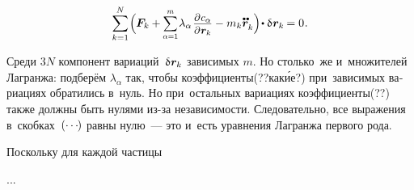\begin{otherlanguage}{russian}
\nopagebreak\vspace{-0.2em}\begin{equation}
\displaystyle \sum_{k=1}^{N} \hspace{-0.2ex} \left(^{\mathstrut} \hspace{-0.16ex} \bm{F}_k \right. \hspace{-0.32ex} + \hspace{-0.05ex}
\scalebox{0.88}[0.92]{$ \displaystyle \sum_{\alpha=1}^{m} $} \hspace{.16ex} \lambda_{\alpha} \hspace{.2ex} \scalebox{0.92}{$\displaystyle \frac{\raisemath{-0.12em}{\partial \hspace{.1ex} c_{\alpha}}}{\partial \hspace{.1ex} \bm{r}_k}$}
- \left. \hspace{-0.25ex} m_k \mathdotdotabove{\bm{r}}_k ^{\mathstrut}\right) \hspace{-0.32ex} \dotp \variation{\hspace{.1ex}\bm{r}_k} \hspace{-0.16ex} = 0 \hspace{0.1ex} .
\end{equation}

\vspace{-0.1em} \noindent Среди $3N$ компонент вариаций~${\variation{\hspace{.1ex}\bm{r}_k}}$ зависимых $m$. Но столько~же и~множителей Лагранжа: подберём $\lambda_{\alpha}$ так, чтобы коэффициенты(??как\'{и}е?) при~зависимых вариациях обратились в~нуль. Но при~остальных вариациях коэффициенты(??) также должны быть нулями из\hbox{-}за независимости. Следовательно, все выражения в~скобках~${(\cdots\hspace{-0.2ex})}$ равны нулю~--- это и~есть уравнения Лагранжа первого рода.

Поскольку для каждой частицы

...



\end{otherlanguage}



